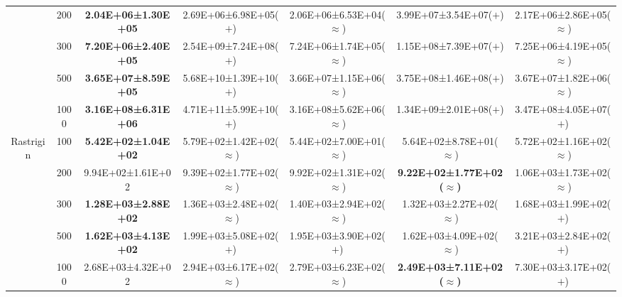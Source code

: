\begin{tabular}{|cc|c|c|c|c|c|}
\multicolumn{1}{|c|}{}                            & 200       & \textbf{2.04E+06±1.30E+05} & 2.69E+06±6.98E+05($+$)                & 2.06E+06±6.53E+04($\approx$) & 3.99E+07±3.54E+07($+$)                & 2.17E+06±2.86E+05($\approx$)          \\ \cline{2-7} 
\multicolumn{1}{|c|}{}                            & 300       & \textbf{7.20E+06±2.40E+05} & 2.54E+09±7.24E+08($+$)                & 7.24E+06±1.74E+05($\approx$) & 1.15E+08±7.39E+07($+$)                & 7.25E+06±4.19E+05($\approx$)          \\ \cline{2-7} 
\multicolumn{1}{|c|}{}                            & 500       & \textbf{3.65E+07±8.59E+05} & 5.68E+10±1.39E+10($+$)                & 3.66E+07±1.15E+06($\approx$) & 3.75E+08±1.46E+08($+$)                & 3.67E+07±1.82E+06($\approx$)          \\ \cline{2-7} 
\multicolumn{1}{|c|}{}                            & 1000      & \textbf{3.16E+08±6.31E+06} & 4.71E+11±5.99E+10($+$)                & 3.16E+08±5.62E+06($\approx$) & 1.34E+09±2.01E+08($+$)                & 3.47E+08±4.05E+07($+$)                \\ \hline
\multicolumn{1}{|c|}{\multirow{5}{*}{Rastrigin}}  & 100       & \textbf{5.42E+02±1.04E+02} & 5.79E+02±1.42E+02($\approx$)          & 5.44E+02±7.00E+01($\approx$) & 5.64E+02±8.78E+01($\approx$)          & 5.72E+02±1.16E+02($\approx$)          \\ \cline{2-7} 
\multicolumn{1}{|c|}{}                            & 200       & 9.94E+02±1.61E+02          & 9.39E+02±1.77E+02($\approx$)          & 9.92E+02±1.31E+02($\approx$) & \textbf{9.22E+02±1.77E+02($\approx$)} & 1.06E+03±1.73E+02($\approx$)          \\ \cline{2-7} 
\multicolumn{1}{|c|}{}                            & 300       & \textbf{1.28E+03±2.88E+02} & 1.36E+03±2.48E+02($\approx$)          & 1.40E+03±2.94E+02($\approx$) & 1.32E+03±2.27E+02($\approx$)          & 1.68E+03±1.99E+02($+$)                \\ \cline{2-7} 
\multicolumn{1}{|c|}{}                            & 500       & \textbf{1.62E+03±4.13E+02} & 1.99E+03±5.08E+02($+$)                & 1.95E+03±3.90E+02($+$)       & 1.62E+03±4.09E+02($\approx$)          & 3.21E+03±2.84E+02($+$)                \\ \cline{2-7} 
\multicolumn{1}{|c|}{}                            & 1000      & 2.68E+03±4.32E+02          & 2.94E+03±6.17E+02($\approx$)          & 2.79E+03±6.23E+02($\approx$) & \textbf{2.49E+03±7.11E+02($\approx$)} & 7.30E+03±3.17E+02($+$)                \\ \hline

\end{tabular}
